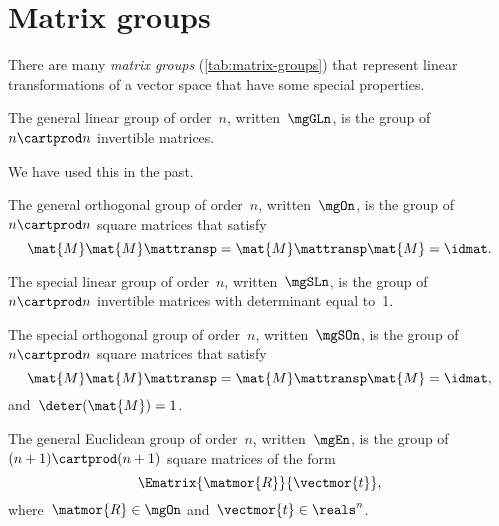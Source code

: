 \section{Matrix groups}


There are many \emph{matrix groups} (\cref{tab:matrix-groups}) that represent linear transformations of a vector space that have some special properties.

\begin{definition}
	\label{def:general-linear-group}
	The general linear group of order~$n$, written~$\mgGLn$, is the group of $n\cartprod n$ invertible matrices.
\end{definition}

We have used this in the past.

\begin{definition}
	\label{def:general-orthogonal-group}
	The general orthogonal group of order~$n$, written~$\mgOn$, is the group of~$n\cartprod n$ square matrices that satisfy
	\begin{equation}
		\mat{M} \mat{M}\mattransp = \mat{M}\mattransp \mat{M} = \idmat.
	\end{equation}
\end{definition}

\begin{definition}
	\label{def:special-linear-group}
	The special linear group of order~$n$, written~$\mgSLn$, is the group of~$n\cartprod n$ invertible matrices with determinant equal to~1.
\end{definition}
\begin{definition}
	\label{def:special-orthogonal-group}
	The special orthogonal group of order~$n$, written~$\mgSOn$, is the group of~$n\cartprod n$ square matrices that satisfy
	\begin{equation}
		\mat{M} \mat{M}\mattransp = \mat{M}\mattransp \mat{M} = \idmat,
	\end{equation}
	and~$\deter(\mat{M}) = 1$.
\end{definition}

\begin{definition}
	\label{def:general-euclidean-group}
	The general Euclidean group of order~$n$, written~$\mgEn$, is the group of~$(n+1)\cartprod (n+1)$ square matrices of the form
	\begin{equation}
		\label{eq:En-def}
		\Ematrix{\matmor{R}}{\vectmor{t}},
	\end{equation}
	where~$\matmor{R}\in \mgOn$ and~$\vectmor{t} \in \reals^n$.
\end{definition}

